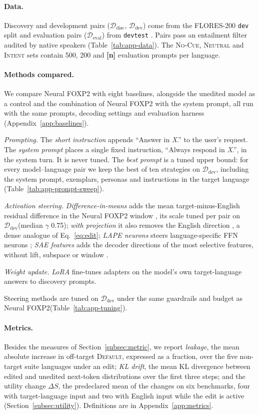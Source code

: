 \documentclass[11pt]{article}
\newcommand{\res}[1]{\textcolor{red!70!black}{\textbf{[#1]}}}
\newcommand{\foxp}{Neural FOXP2\xspace}
\newcommand{\default}{\textsc{Default}\xspace}
\newcommand{\Deval}{\ensuremath{\mathcal{D}_{\mathrm{eval}}}\xspace}
\newcommand{\Ddev}{\ensuremath{\mathcal{D}_{\mathrm{dev}}}\xspace}
\newcommand{\Ddisc}{\ensuremath{\mathcal{D}_{\mathrm{disc}}}\xspace}
\newcommand{\nocue}{\textsc{No-Cue}\xspace}
\newcommand{\neutral}{\textsc{Neutral}\xspace}
\newcommand{\intent}{\textsc{Intent}\xspace}
\begin{document}
\paragraph{Data.}
Discovery and development pairs (\Ddisc, \Ddev) come from the FLORES-200 \texttt{dev} split and evaluation pairs (\Deval) from \texttt{devtest} \citep{flores200}. Pairs pass an entailment filter audited by native speakers (Table~\ref{tab:app-data}). The \nocue, \neutral and \intent sets contain 500, 200 and \res{n} evaluation prompts per language.

\paragraph{Methods compared.}
We compare \foxp with eight baselines, alongside the unedited model as a control and the combination of \foxp with the system prompt, all run with the same prompts, decoding settings and evaluation harness (Appendix~\ref{app:baselines}).

\emph{Prompting.} The \emph{short instruction} appends ``Answer in \textit{X}.'' to the user's request. The \emph{system prompt} places a single fixed instruction, ``Always respond in \textit{X}.'', in the system turn. It is never tuned. The \emph{best prompt} is a tuned upper bound: for every model--language pair we keep the best of ten strategies on \Ddev, including the system prompt, exemplars, personas and instructions in the target language (Table~\ref{tab:app-prompt-sweep}).

\emph{Activation steering.} \emph{Difference-in-means} adds the mean target-minus-English residual difference in the \foxp window \citep{rimsky-etal-2024-steering}, its scale tuned per pair on \Ddev (median $\gamma$ 0.75); \emph{with projection} it also removes the English direction \citep{arditi2024refusal}, a dense analogue of Eq.~\ref{eq:edit}; \emph{LAPE neurons} steers language-specific FFN neurons \citep{tang-etal-2024-language}; \emph{SAE features} adds the decoder directions of the most selective features, without lift, subspace or window \citep{chou2025causallanguagecontrolmultilingual}.

\emph{Weight update.} \emph{LoRA} fine-tunes adapters \citep{hu2022lora} on the model's own target-language answers to discovery prompts.

Steering methods are tuned on \Ddev under the same guardrails and budget as \foxp (Table~\ref{tab:app-tuning}).

\paragraph{Metrics.}
Besides the measures of Section~\ref{subsec:metric}, we report \emph{leakage}, the mean absolute increase in off-target \default, expressed as a fraction, over the five non-target suite languages under an edit; \emph{KL drift}, the mean KL divergence between edited and unedited next-token distributions over the first three steps; and the utility change $\Delta S$, the predeclared mean of the changes on six benchmarks, four with target-language input and two with English input while the edit is active (Section~\ref{subsec:utility}). Definitions are in Appendix~\ref{app:metrics}.
\end{document}

